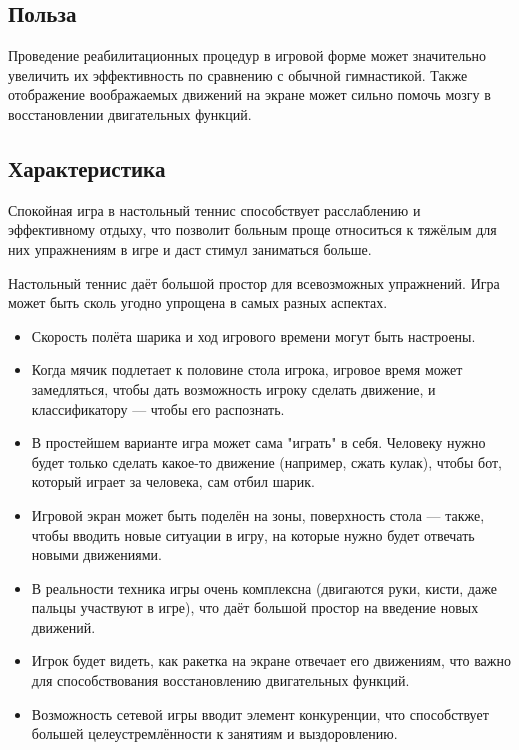 \documentclass[a4paper,12pt]{article}
\begin{document}
\subsection*{Польза}

\noindent
Проведение реабилитационных процедур в игровой форме может значительно увеличить их эффективность по сравнению с обычной гимнастикой. Также отображение воображаемых движений на экране может сильно помочь мозгу в восстановлении двигательных функций.


\subsection*{Характеристика}

\noindent
Спокойная игра в настольный теннис способствует расслаблению и эффективному отдыху, что позволит больным проще относиться к тяжёлым для них упражнениям в игре и даст стимул заниматься больше.

\noindent
Настольный теннис даёт большой простор для всевозможных упражнений. Игра может быть сколь угодно упрощена в самых разных аспектах.

\begin{itemize}
    \item Скорость полёта шарика и ход игрового времени могут быть настроены.
    
    \item Когда мячик подлетает к половине стола игрока, игровое время может замедляться, чтобы дать возможность игроку сделать движение, и классификатору --- чтобы его распознать.
    
    \item  В простейшем варианте игра может сама "играть" в себя. Человеку нужно будет только сделать какое-то движение (например, сжать кулак), чтобы бот, который играет за человека, сам отбил шарик.
    
    \item Игровой экран может быть поделён на зоны, поверхность стола --- также, чтобы вводить новые ситуации в игру, на которые нужно будет отвечать новыми движениями.
    
    \item В реальности техника игры очень комплексна (двигаются руки, кисти, даже пальцы участвуют в игре), что даёт большой простор на введение новых движений.
    
    \item Игрок будет видеть, как ракетка на экране отвечает его движениям, что важно для способствования восстановлению двигательных функций.
    
    \item Возможность сетевой игры вводит элемент конкуренции, что способствует большей целеустремлённости к занятиям и выздоровлению.
\end{itemize}
\end{document}
